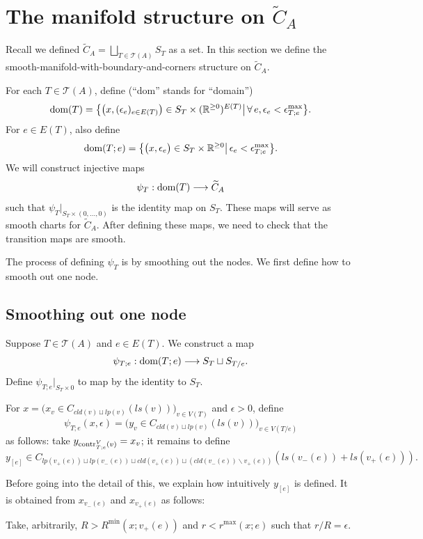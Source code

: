 \documentclass[11pt]{article}
\theoremstyle{definition}
\theoremstyle{remark}
\def\wt#1{\widetilde{#1}}
\def\R{\mathbb{R}}
\def\cT{\mathcal{T}}
\def\dom{{\tn{dom}}}
\def\tn#1{\textnormal{#1}}
\begin{document}
\section{The manifold structure on \texorpdfstring{$\wt{C}_A$}{the big configuration space}}
\label{conftilde_sec}

Recall we defined $\wt{C}_A=\bigsqcup_{T\in\cT(A)}S_T$ as a set. 
In this section we define the smooth-manifold-with-boundary-and-corners structure on $\wt{C}_A$. 


For each $T\in\cT(A)$, define (``dom'' stands for ``domain'')
$$\dom(T)=\big\{\big(x,(\epsilon_e)_{e\in E(T)}\big)\in S_T\times(\R^{\ge0})^{E(T)}\big|\,\forall\,e, \epsilon_e<\epsilon^{\max}_{T;e}\big\}.$$
For $e\in E(T)$, also define
$$\dom(T;e)=\big\{\big(x,\epsilon_e\big)\in S_T\times\R^{\ge0}\big|\, \epsilon_e<\epsilon^{\max}_{T;e}\big\}.$$
We will construct injective maps 
$$\psi_T:\dom(T)\longrightarrow \widetilde{C}_A$$
such that $\psi_T|_{S_T\times(0,\ldots,0)}$ is the identity map on $S_T$. 
These maps will serve as smooth charts for $\widetilde{C}_A$.
After defining these maps, we need to check that the transition maps are smooth.  


The process of defining $\psi_T$ is by smoothing out the nodes. We first define how to smooth out one node. 

\subsection{Smoothing out one node}

Suppose $T\in\cT(A)$ and $e\in E(T)$. 
We construct a map 
$$\psi_{T;e}: \dom(T;e)\longrightarrow S_T\sqcup S_{T/e}.$$
Define $\psi_{T;e}|_{S_T\times 0}$ to map by the identity to $S_T$. 

For $x=\big(x_v\in C_{cld(v)\sqcup lp(v)}(ls(v))\big)_{v\in V(T)}$ and $\epsilon>0$, define 
$$\psi_{T;e}(x,\epsilon)=\big(y_v\in C_{cld(v)\sqcup lp(v)}(ls(v))\big)_{v\in V(T/e)}$$ 
as follows: 
take $y_{\tn{contr}^V_{T;e}(v)}=x_v$; it remains to define $$y_{[e]}\in C_{lp(v_+(e))\sqcup lp(v_-(e))\sqcup cld(v_+(e))\sqcup (cld(v_-(e))\backslash v_+(e))}(ls(v_-(e))+ls(v_+(e))).$$

Before going into the detail of this, we explain how intuitively $y_{[e]}$ is defined. It is obtained from $x_{v_-(e)}$ and $x_{v_+(e)}$ as follows: 

Take, arbitrarily, $R>R^{\min}(x;v_+(e))$ and $r<r^{\max}(x;e)$ such that $r/R=\epsilon$. 
\end{document}
